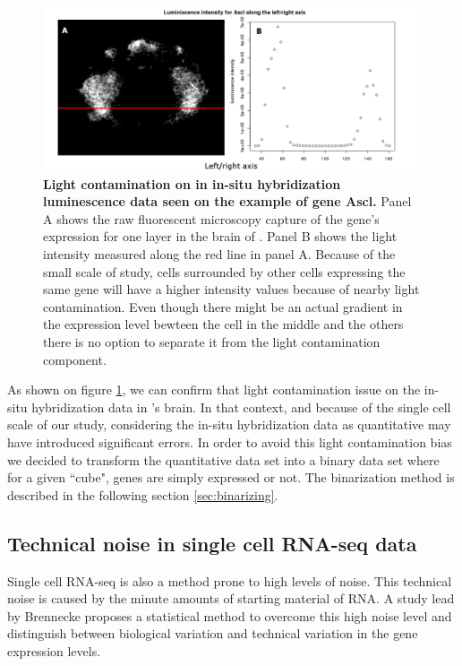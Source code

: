    \begin{figure}[bth]
\centerline{\includegraphics[width=\linewidth]{gfx/chapter2/whybina.png}}
\caption{{\bf Light contamination on in in-situ hybridization luminescence data seen on the example of gene Ascl.} Panel A shows the raw fluorescent microscopy capture of the gene's expression for one layer in the brain of \platy{}. Panel B shows the light intensity measured along the red line in panel A. Because of the small scale of study, cells surrounded by other cells expressing the same gene will have a higher intensity values because of nearby light contamination. Even though there might be an actual gradient in the expression level bewteen the cell in the middle and the others there is no option to separate it from the light contamination component.}\label{fig:why_binarize}
	\end{figure}
  
  As shown on figure \ref{fig:why_binarize}, we can confirm that light contamination issue on the in-situ hybridization data in \platy{}'s brain. In that context, and because of the single cell scale of our study, considering the in-situ hybridization data as quantitative may have introduced significant errors. In order to avoid this light contamination bias we decided to transform the quantitative data set into a binary data set where for a given ``cube", genes are simply expressed or not. The binarization method is described in the following section \ref{sec:binarizing}.
  


  \subsection{Technical noise in single cell RNA-seq data}
  Single cell RNA-seq is also a method prone to high levels of noise. This technical noise is caused by the minute amounts of starting material of RNA. A study lead by Brennecke \cite{brennecke13} proposes a statistical method to overcome this high noise level and distinguish between biological variation and technical variation in the gene expression levels.\\


